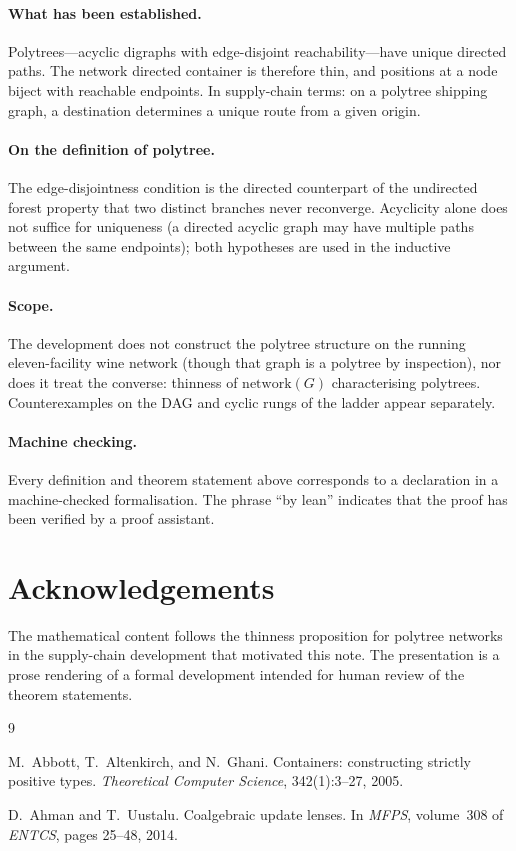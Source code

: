 \documentclass[11pt,a4paper]{article}
\theoremstyle{plain}
\theoremstyle{definition}
\begin{document}
\paragraph{What has been established.}
Polytrees---acyclic digraphs with edge-disjoint reachability---have unique
directed paths. The network directed container is therefore thin, and positions
at a node biject with reachable endpoints. In supply-chain terms: on a
polytree shipping graph, a destination determines a unique route from a given
origin.

\paragraph{On the definition of polytree.}
The edge-disjointness condition is the directed counterpart of the undirected
forest property that two distinct branches never reconverge. Acyclicity alone
does not suffice for uniqueness (a directed acyclic graph may have multiple
paths between the same endpoints); both hypotheses are used in the inductive
argument.

\paragraph{Scope.}
The development does not construct the polytree structure on the running
eleven-facility wine network (though that graph is a polytree by inspection),
nor does it treat the converse: thinness of $\mathrm{network}(G)$ characterising
polytrees. Counterexamples on the DAG and cyclic rungs of the ladder appear
separately.

\paragraph{Machine checking.}
Every definition and theorem statement above corresponds to a declaration in a
machine-checked formalisation. The phrase ``by lean'' indicates that the proof
has been verified by a proof assistant.

\section*{Acknowledgements}

The mathematical content follows the thinness proposition for polytree networks
in the supply-chain development that motivated this note. The presentation is a
prose rendering of a formal development intended for human review of the
theorem statements.

\begin{thebibliography}{9}

M.~Abbott, T.~Altenkirch, and N.~Ghani.
\newblock Containers: constructing strictly positive types.
\newblock \emph{Theoretical Computer Science}, 342(1):3--27, 2005.

D.~Ahman and T.~Uustalu.
\newblock Coalgebraic update lenses.
\newblock In \emph{MFPS}, volume~308 of \emph{ENTCS}, pages 25--48, 2014.

\end{thebibliography}
\end{document}
